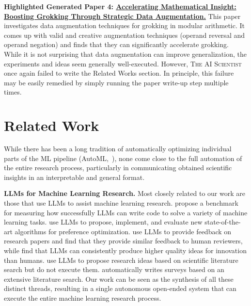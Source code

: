 \documentclass[11pt, a4paper]{include/gdm_format}
\newcommand{\ouralgo}{\textsc{The AI Scientist}\xspace}
\begin{document}
\textbf{Highlighted Generated Paper 4: \hyperref[paper:data_augmentation_grokking]{Accelerating Mathematical Insight: Boosting Grokking Through Strategic Data Augmentation.}}
This paper investigates data augmentation techniques for grokking in modular arithmetic. It comes up with valid and creative augmentation techniques (operand reversal and operand negation) and finds that they can significantly accelerate grokking. While it is not surprising that data augmentation can improve generalization, the experiments and ideas seem generally well-executed. However, \ouralgo once again failed to write the Related Works section. In principle, this failure may be easily remedied by simply running the paper write-up step multiple times.

\section{Related Work}
\label{sec:related_work}

While there has been a long tradition of automatically optimizing individual parts of the ML pipeline  (AutoML,~\citet{hutter2019automated, he2021automl}), none come close to the full automation of the entire research process, particularly in communicating obtained scientific insights in an interpretable and general format.

\textbf{LLMs for Machine Learning Research.}
Most closely related to our work are those that use LLMs to assist machine learning research.
\citet{huang2024mlagentbench} propose a benchmark for measuring how successfully LLMs can write code to solve a variety of machine learning tasks.
\citet{lu2024discovering} use LLMs to propose, implement, and evaluate new state-of-the-art algorithms for preference optimization.
\citet{liang2024can} use LLMs to provide feedback on research papers and find that they provide similar feedback to human reviewers, while \citet{girotra2023ideas} find that LLMs can consistently produce higher quality ideas for innovation than humans.
\citet{wang2024scimonscientificinspirationmachines, baek2024researchagentiterativeresearchidea} use LLMs to propose research ideas based on scientific literature search but do not execute them.
\citet{wang2024autosurveylargelanguagemodels} automatically writes surveys based on an extensive literature search.
Our work can be seen as the synthesis of all these distinct threads, resulting in a single autonomous open-ended system that can execute the entire machine learning research process.
\end{document}
